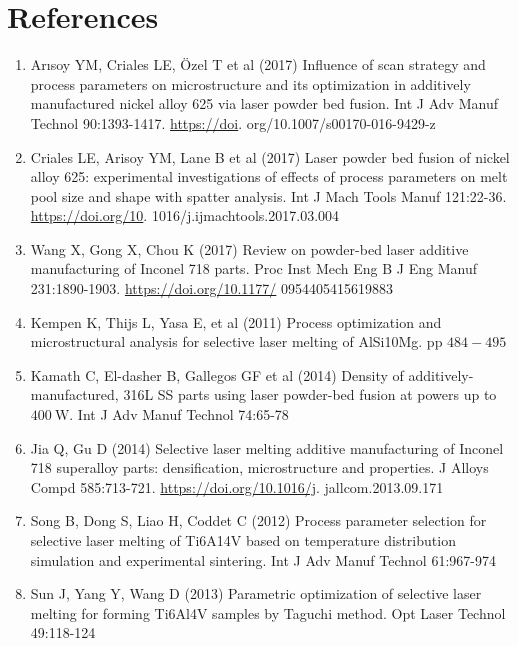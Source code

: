 \documentclass[10pt]{article}
\begin{document}
\section*{References}
\begin{enumerate}
  \item Arısoy YM, Criales LE, Özel T et al (2017) Influence of scan strategy and process parameters on microstructure and its optimization in additively manufactured nickel alloy 625 via laser powder bed fusion. Int J Adv Manuf Technol 90:1393-1417. \href{https://doi}{https://doi}. org/10.1007/s00170-016-9429-z

  \item Criales LE, Arisoy YM, Lane B et al (2017) Laser powder bed fusion of nickel alloy 625: experimental investigations of effects of process parameters on melt pool size and shape with spatter analysis. Int J Mach Tools Manuf 121:22-36. \href{https://doi.org/10}{https://doi.org/10}. 1016/j.ijmachtools.2017.03.004

  \item Wang X, Gong X, Chou K (2017) Review on powder-bed laser additive manufacturing of Inconel 718 parts. Proc Inst Mech Eng B J Eng Manuf 231:1890-1903. \href{https://doi.org/10.1177/}{https://doi.org/10.1177/} 0954405415619883

  \item Kempen K, Thijs L, Yasa E, et al (2011) Process optimization and microstructural analysis for selective laser melting of AlSi10Mg. pp $484-495$

  \item Kamath C, El-dasher B, Gallegos GF et al (2014) Density of additively-manufactured, 316L SS parts using laser powder-bed fusion at powers up to $400 \mathrm{~W}$. Int J Adv Manuf Technol 74:65-78

  \item Jia Q, Gu D (2014) Selective laser melting additive manufacturing of Inconel 718 superalloy parts: densification, microstructure and properties. J Alloys Compd 585:713-721. \href{https://doi.org/10.1016/j}{https://doi.org/10.1016/j}. jallcom.2013.09.171

  \item Song B, Dong S, Liao H, Coddet C (2012) Process parameter selection for selective laser melting of Ti6A14V based on temperature distribution simulation and experimental sintering. Int J Adv Manuf Technol 61:967-974

  \item Sun J, Yang Y, Wang D (2013) Parametric optimization of selective laser melting for forming Ti6Al4V samples by Taguchi method. Opt Laser Technol 49:118-124


\end{enumerate}
\end{document}
